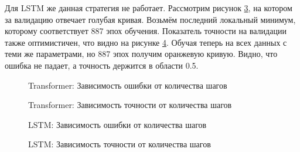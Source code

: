 \documentclass[diploma]{nanolab2015}
\begin{document}
Для LSTM же данная стратегия не работает. Рассмотрим рисунок \ref{pic7}, на котором за валидацию отвечает голубая кривая. Возьмём последний локальный минимум, которому соответствует 887 эпох обучения. Показатель точности на валидации также оптимистичен, что видно на рисунке \ref{pic8}. Обучая теперь на всех данных с теми же параметрами, но 887 эпох получим оранжевую кривую. Видно, что ошибка не падает, а точность держится в области 0.5.

\begin{figure}[ht]
    \centering
    \caption{Transformer: Зависимость ошибки от количества шагов}
    
    \label{pic5}
\end{figure}

\begin{figure}[ht]
    \centering
    \caption{Transformer: Зависимость точности от количества шагов}
    
    \label{pic6}
\end{figure}

\begin{figure}[ht]
    \centering
    \caption{LSTM: Зависимость ошибки от количества шагов}
    
    \label{pic7}
\end{figure}

\begin{figure}[ht]
    \centering
    \caption{LSTM: Зависимость точности от количества шагов}
    
    \label{pic8}
\end{figure}
\end{document}
